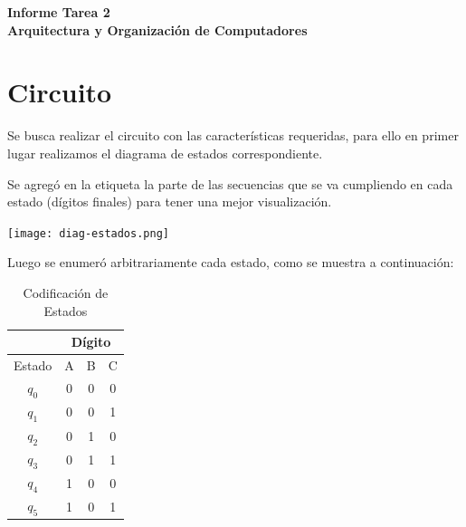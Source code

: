 \documentclass[11pt,letterpaper]{article}
\newcommand{\titulo}{Informe Tarea 2 \\ Arquitectura y Organización de Computadores}
\renewcommand{\maketitle}
{
\thispagestyle{fancy}
\begin{center}
\begin{Large}
\textbf{\titulo}\\
\end{Large}
\end{center}
\vspace{0.3cm}
}
\begin{document}
\setcounter{secnumdepth}{0}
\maketitle
\section{Circuito}
Se busca realizar el circuito con las características requeridas, para ello en primer lugar realizamos el diagrama de estados correspondiente.

Se agregó en la etiqueta la parte de las secuencias que se va cumpliendo en cada estado (dígitos finales) para tener una mejor visualización.
\begin{center}
\texttt{[image: diag-estados.png]}
\end{center}

Luego se enumeró arbitrariamente cada estado, como se muestra a continuación:
\vspace{0.2cm}
\begin{table}[h]
\centering
\caption{Codificación de Estados}
\vspace{0.2cm}
\begin{tabular}{c|c|c|c|}
\cline{2-4}
                             & \multicolumn{3}{c|}{Dígito} \\ \hline
\multicolumn{1}{|c|}{Estado} & A       & B       & C       \\ \hline
\multicolumn{1}{|c|}{$q_0$}     & 0       & 0       & 0       \\ \hline
\multicolumn{1}{|c|}{$q_1$}     & 0       & 0       & 1       \\ \hline
\multicolumn{1}{|c|}{$q_2$}     & 0       & 1       & 0       \\ \hline
\multicolumn{1}{|c|}{$q_3$}     & 0       & 1       & 1       \\ \hline
\multicolumn{1}{|c|}{$q_4$}     & 1       & 0       & 0       \\ \hline
\multicolumn{1}{|c|}{$q_5$}     & 1       & 0       & 1       \\ \hline
\end{tabular}
\end{table}
\end{document}

